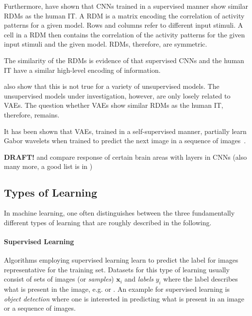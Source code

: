Furthermore, \citet{khaligh2014deep} have shown that \acp{CNN} trained in a supervised manner show similar \acp{RDM} as the human \ac{IT}.
A \ac{RDM} is a matrix encoding the correlation of activity patterns for a given model.
Rows and columns refer to different input stimuli.
A cell in a \ac{RDM} then contains the correlation of the activity patterns for the given input stimuli and the given model.
\acp{RDM}, therefore, are symmetric.

The similarity of the \acp{RDM} is evidence of that supervised \acp{CNN} and the human \ac{IT} have a similar high-level encoding of information.

\citet{khaligh2014deep} also show that this is not true for a variety of unsupervised models.
The unsupervised models under investigation, however, are only losely related to \acp{VAE}.
The question whether \acp{VAE} show similar \acp{RDM} as the human \ac{IT}, therefore, remains.

It has been shown that \acp{VAE}, trained in a self-supervised manner, partially learn Gabor wavelets when trained to predict the next image in a sequence of images~\citep{palm2012prediction}.

\textbf{DRAFT!}
\citet{eickenberg2017seeing} and \citet{wen2018neural} compare response of certain brain areas with layers in CNNs (also many more, a good list is in \citet{wen2018neural})



\subsection{Types of Learning}\label{subsec:types-of-learning}

In machine learning, one often distinguishes between the three fundamentally different types of learning that are roughly described in the following.

\paragraph{Supervised Learning}
Algorithms employing supervised learning learn to predict the label for images representative for the training set.
Datasets for this type of learning usually consist of sets of images (or \textit{samples}) $\bm{x}_i$ and \textit{labels} $y_i$ where the label describes what is present in the image, e.g.  or .
An example for supervised learning is \textit{object detection} where one is interested in predicting what is present in an image or a sequence of images.

